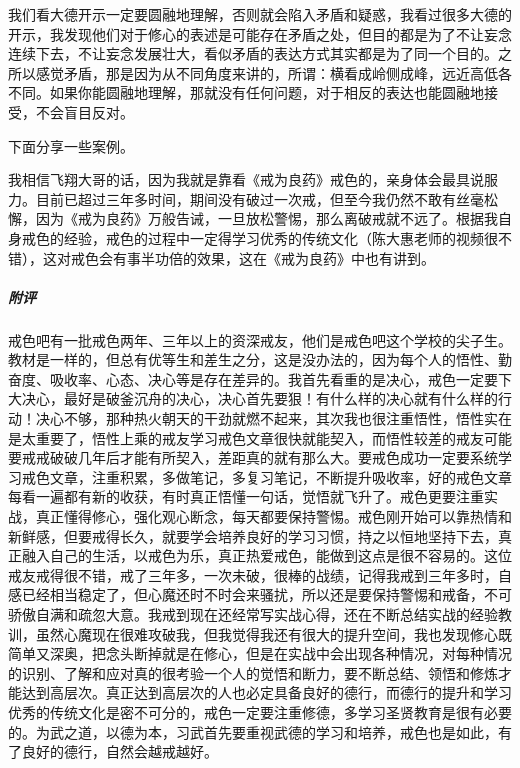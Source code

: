 我们看大德开示一定要圆融地理解，否则就会陷入矛盾和疑惑，我看过很多大德的开示，我发现他们对于修心的表述是可能存在矛盾之处，但目的都是为了不让妄念连续下去，不让妄念发展壮大，看似矛盾的表达方式其实都是为了同一个目的。之所以感觉矛盾，那是因为从不同角度来讲的，所谓：横看成岭侧成峰，远近高低各不同。如果你能圆融地理解，那就没有任何问题，对于相反的表达也能圆融地接受，不会盲目反对。

下面分享一些案例。

\begin{case}
    我相信飞翔大哥的话，因为我就是靠看《戒为良药》戒色的，亲身体会最具说服力。目前已超过三年多时间，期间没有破过一次戒，但至今我仍然不敢有丝毫松懈，因为《戒为良药》万般告诫，一旦放松警惕，那么离破戒就不远了。根据我自身戒色的经验，戒色的过程中一定得学习优秀的传统文化（陈大惠老师的视频很不错），这对戒色会有事半功倍的效果，这在《戒为良药》中也有讲到。
    \subparagraph{附评} 戒色吧有一批戒色两年、三年以上的资深戒友，他们是戒色吧这个学校的尖子生。教材是一样的，但总有优等生和差生之分，这是没办法的，因为每个人的悟性、勤奋度、吸收率、心态、决心等是存在差异的。我首先看重的是决心，戒色一定要下大决心，最好是破釜沉舟的决心，决心首先要狠！有什么样的决心就有什么样的行动！决心不够，那种热火朝天的干劲就燃不起来，其次我也很注重悟性，悟性实在是太重要了，悟性上乘的戒友学习戒色文章很快就能契入，而悟性较差的戒友可能要戒戒破破几年后才能有所契入，差距真的就有那么大。要戒色成功一定要系统学习戒色文章，注重积累，多做笔记，多复习笔记，不断提升吸收率，好的戒色文章每看一遍都有新的收获，有时真正悟懂一句话，觉悟就飞升了。戒色更要注重实战，真正懂得修心，强化观心断念，每天都要保持警惕。戒色刚开始可以靠热情和新鲜感，但要戒得长久，就要学会培养良好的学习习惯，持之以恒地坚持下去，真正融入自己的生活，以戒色为乐，真正热爱戒色，能做到这点是很不容易的。这位戒友戒得很不错，戒了三年多，一次未破，很棒的战绩，记得我戒到三年多时，自感已经相当稳定了，但心魔还时不时会来骚扰，所以还是要保持警惕和戒备，不可骄傲自满和疏忽大意。我戒到现在还经常写实战心得，还在不断总结实战的经验教训，虽然心魔现在很难攻破我，但我觉得我还有很大的提升空间，我也发现修心既简单又深奥，把念头断掉就是在修心，但是在实战中会出现各种情况，对每种情况的识别、了解和应对真的很考验一个人的觉悟和断力，要不断总结、领悟和修炼才能达到高层次。真正达到高层次的人也必定具备良好的德行，而德行的提升和学习优秀的传统文化是密不可分的，戒色一定要注重修德，多学习圣贤教育是很有必要的。为武之道，以德为本，习武首先要重视武德的学习和培养，戒色也是如此，有了良好的德行，自然会越戒越好。
\end{case}

